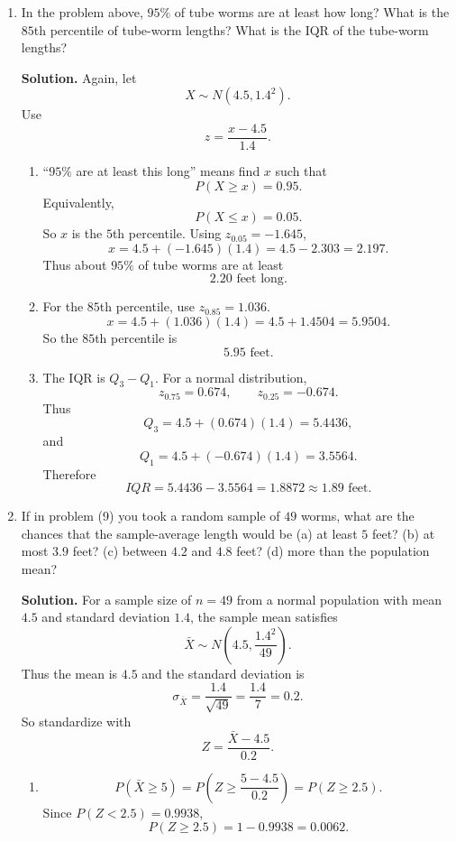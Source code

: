 \documentclass[12pt]{article}
\begin{document}
\begin{enumerate}[label=(\arabic*), leftmargin=*]
\item In the problem above, $95\%$ of tube worms are at least how long? What is the $85$th percentile of tube-worm lengths? What is the IQR of the tube-worm lengths?

\par\medskip
\noindent\textbf{Solution.}
Again, let
\[
X\sim N(4.5,1.4^2).
\]
Use
\[
z=\frac{x-4.5}{1.4}.
\]

\begin{enumerate}[label=(\alph*)]
    \item ``$95\%$ are at least this long'' means find $x$ such that
    \[
    P(X\ge x)=0.95.
    \]
    Equivalently,
    \[
    P(X\le x)=0.05.
    \]
    So $x$ is the $5$th percentile. Using $z_{0.05}=-1.645$,
    \[
    x=4.5+(-1.645)(1.4)=4.5-2.303=2.197.
    \]
    Thus about $95\%$ of tube worms are at least
    \[
    2.20\text{ feet long}.
    \]

    \item For the $85$th percentile, use $z_{0.85}=1.036$.
    \[
    x=4.5+(1.036)(1.4)=4.5+1.4504=5.9504.
    \]
    So the $85$th percentile is
    \[
    5.95\text{ feet}.
    \]

    \item The IQR is $Q_3-Q_1$. For a normal distribution,
    \[
    z_{0.75}=0.674,
    \qquad
    z_{0.25}=-0.674.
    \]
    Thus
    \[
    Q_3=4.5+(0.674)(1.4)=5.4436,
    \]
    and
    \[
    Q_1=4.5+(-0.674)(1.4)=3.5564.
    \]
    Therefore
    \[
    IQR=5.4436-3.5564=1.8872\approx 1.89\text{ feet}.
    \]
\end{enumerate}

\item If in problem (9) you took a random sample of $49$ worms, what are the chances that the sample-average length would be (a) at least $5$ feet? (b) at most $3.9$ feet? (c) between $4.2$ and $4.8$ feet? (d) more than the population mean?

\par\medskip
\noindent\textbf{Solution.}
For a sample size of $n=49$ from a normal population with mean $4.5$ and standard deviation $1.4$, the sample mean satisfies
\[
\bar X\sim N\left(4.5,\frac{1.4^2}{49}\right).
\]
Thus the mean is $4.5$ and the standard deviation is
\[
\sigma_{\bar X}=\frac{1.4}{\sqrt{49}}=\frac{1.4}{7}=0.2.
\]
So standardize with
\[
Z=\frac{\bar X-4.5}{0.2}.
\]

\begin{enumerate}[label=(\alph*)]
    \item
    \[
    P(\bar X\ge 5)=P\left(Z\ge \frac{5-4.5}{0.2}\right)=P(Z\ge 2.5).
    \]
    Since $P(Z<2.5)=0.9938$,
    \[
    P(Z\ge 2.5)=1-0.9938=0.0062.
    \]


\end{enumerate}
\end{enumerate}
\end{document}
